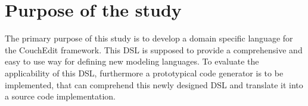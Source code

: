 \documentclass[10pt,a4paper,oneside]{scrartcl}
\newcommand\hint[2]{
\ifthenelse{\boolean{showhints}}{
\begin{center}
\colorbox{black!10}{
\begin{minipage}{.963\textwidth}
#2\hfill\textbf{#1}
\end{minipage}
}\end{center}}{}
}
\begin{document}





\section{Purpose of the study}


The primary purpose of this study is to develop a domain specific language for the CouchEdit framework. This DSL is supposed to provide a comprehensive and easy to use way for defining new modeling languages. To evaluate the applicability of this DSL, furthermore a prototypical code generator is to be implemented, that can comprehend this newly designed DSL and translate it into a source code implementation.
\end{document}
